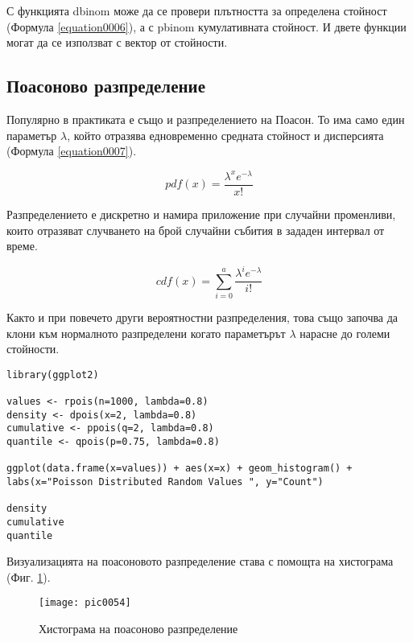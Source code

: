 С функцията dbinom може да се провери плътността за определена стойност (Формула \ref{equation0006}), а с pbinom кумулативната стойност. И двете функции могат да се използват с вектор от стойности. 

\subsection{Поасоново разпределение}

Популярно в практиката е също и разпределението на Поасон. То има само един параметър $\lambda$, който отразява едновременно средната стойност и дисперсията (Формула \ref{equation0007}). 

\begin{equation}
pdf(x) = \frac{\lambda^{x}e^{-\lambda}}{x!}
\label{equation0007}
\end{equation}

Разпределението е дискретно и намира приложение при случайни променливи, които отразяват случването на брой случайни събития в зададен интервал от време. 

\begin{equation}
cdf(x) = \sum_{i=0}^{a}\frac{\lambda^{i}e^{-\lambda}}{i!}
\label{equation0008}
\end{equation}

Както и при повечето други вероятностни разпределения, това също започва да клони към нормалното разпределени когато параметърът $\lambda$ нарасне до големи стойности. 

\begin{lstlisting}[caption=Разпределение на Поасон, label=listing0159]
library(ggplot2)

values <- rpois(n=1000, lambda=0.8)
density <- dpois(x=2, lambda=0.8)
cumulative <- ppois(q=2, lambda=0.8)
quantile <- qpois(p=0.75, lambda=0.8)

ggplot(data.frame(x=values)) + aes(x=x) + geom_histogram() + labs(x="Poisson Distributed Random Values ", y="Count")

density
cumulative
quantile
\end{lstlisting}

Визуализацията на поасоновото разпределение става с помощта на хистограма (Фиг. \ref{figure0054}).

\begin{figure}[h!]
  \centering
  \texttt{[image: pic0054]}
  \caption{Хистограма на поасоново разпределение}
\label{figure0054}
\end{figure}
\FloatBarrier


